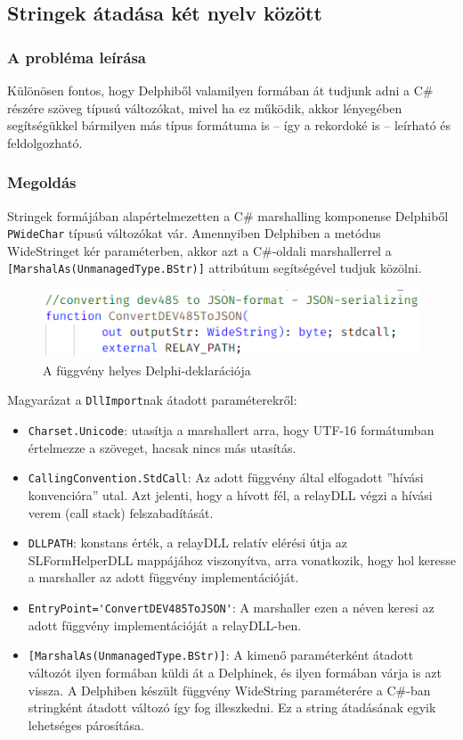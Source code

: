 \documentclass[tocnopagenum]{thesis-ekf}
\begin{document}
	\subsection{Stringek átadása két nyelv között}
	\subsubsection{A probléma leírása} Különösen fontos, hogy Delphiből valamilyen formában át tudjunk adni a C\# részére szöveg típusú változókat, mivel ha ez működik, akkor lényegében segítségükkel bármilyen más típus formátuma is -- így a rekordoké is -- leírható és feldolgozható.
	
	\subsubsection{Megoldás}
	Stringek formájában alapértelmezetten a C\# marshalling komponense Delphiből \verb*|PWideChar| típusú változókat vár. Amennyiben Delphiben a metódus WideStringet kér paraméterben, akkor azt a C\#-oldali marshallerrel a \verb*|[MarshalAs(UnmanagedType.BStr)]| attribútum segítségével tudjuk közölni.\cite{sof_strhandling}
	
	\begin{figure}[H]
		\centering
		\includegraphics[scale=0.85]{string_delphi}
		\caption{A függvény helyes Delphi-deklarációja}
		\label{string_delphi}
	\end{figure}

	Magyarázat a \verb*|DllImport|nak átadott paraméterekről:
	\begin{itemize}
		\item \verb*|Charset.Unicode|: utasítja a marshallert arra, hogy UTF-16 formátumban értelmezze a szöveget, hacsak nincs más utasítás.
		\item \verb*|CallingConvention.StdCall|: Az adott függvény által elfogadott ''hívási konvencióra'' utal. Azt jelenti, hogy a hívott fél, a relayDLL végzi a hívási verem (call stack) felszabadítását.
		\item \verb*|DLLPATH|: konstans érték, a relayDLL relatív elérési útja az SLFormHelperDLL mappájához viszonyítva, arra vonatkozik, hogy hol keresse a marshaller az adott függvény implementációját.
		\item \verb*|EntryPoint='ConvertDEV485ToJSON'|: A marshaller ezen a néven keresi az adott függvény implementációját a relayDLL-ben.
		\item \verb*|[MarshalAs(UnmanagedType.BStr)]|: A kimenő paraméterként átadott változót ilyen formában küldi át a Delphinek, és ilyen formában várja is azt vissza. A Delphiben készült függvény WideString paraméterére a C\#-ban stringként átadott változó így fog illeszkedni. Ez a string átadásának egyik lehetséges párosítása.
	\end{itemize}
\end{document}
